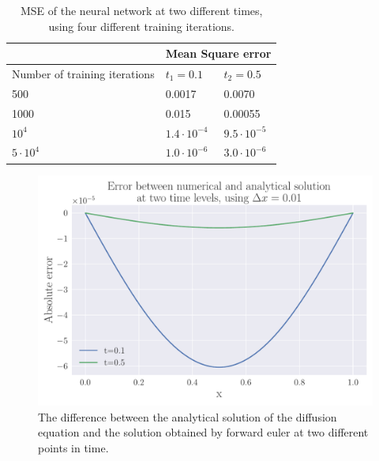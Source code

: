 \documentclass[12pt]{extarticle}
\begin{document}
\begin{table}[h]
	\centering
	\begin{tabular}{l|ll|}
		\cline{2-3}
		& \multicolumn{2}{l|}{Mean Square error} \\ \hline
		\multicolumn{1}{|l|}{Number of training iterations} & \multicolumn{1}{l|}{$t_1 = 0.1$} & $t_2 = 0.5$ \\ \hline
		\multicolumn{1}{|l|}{500}                           & \multicolumn{1}{l|}{0.0017}  & 0.0070  \\ \hline
		\multicolumn{1}{|l|}{1000}                          & \multicolumn{1}{l|}{0.015}   & 0.00055 \\ \hline
		\multicolumn{1}{|l|}{$10^4$}                          & \multicolumn{1}{l|}{$1.4\cdot 10^{-4}$}  & $9.5\cdot10^{-5}$  \\ \hline
		\multicolumn{1}{|l|}{$5\cdot10^4$}                        & \multicolumn{1}{l|}{$1.0\cdot10^{-6}$}        & $3.0\cdot10^{-6}$        \\ \hline
	\end{tabular}
	\caption{MSE of the neural network at two different times, using four different training iterations.}
	\label{tab:NN_MSE_iterations}
\end{table}



\begin{figure}[h]
	\centering
	\includegraphics[width=0.75\linewidth]{../output/plots/error_FE_x_dx_001.pdf}
	\caption{The difference between the analytical solution of the diffusion equation and the solution obtained by forward euler at two different points in time.}
	\label{fig:FE_absolute_difference}
\end{figure}
\end{document}
